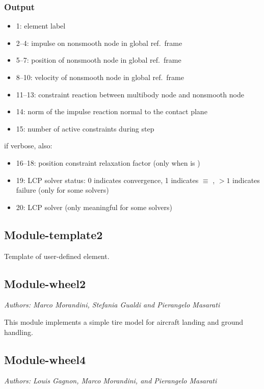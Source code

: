 \subsubsection{Output}
\begin{itemize}
\item 1: element label
\item 2--4:   impulse on nonsmooth node in global ref.\ frame
\item 5--7:   position of nonsmooth node in global ref.\ frame
\item 8--10:  velocity of nonsmooth node in global ref.\ frame
\item 11--13: constraint reaction between multibody node and nonsmooth node
\item 14:    norm of the impulse reaction normal to the contact plane
\item 15:    number of active constraints during step
\end{itemize}
if verbose, also:
\begin{itemize}
\item 16--18: position constraint relaxation factor
	(only when  is )
\item 19:    LCP solver status:
	0 indicates convergence,
	1 indicates  $\equiv$ ,
	$>1$ indicates failure
(only for some solvers)
\item 20:    LCP solver 
(only meaningful for some solvers)
\end{itemize}


\subsection{Module-template2}
Template of user-defined element.

\subsection{Module-wheel2}
\emph{Authors: Marco Morandini, Stefania Gualdi and Pierangelo Masarati}

\noindent
This module implements a simple tire model for aircraft landing and ground handling.


\subsection{Module-wheel4}
\emph{Authors: Louis Gagnon, Marco Morandini, and Pierangelo Masarati}

